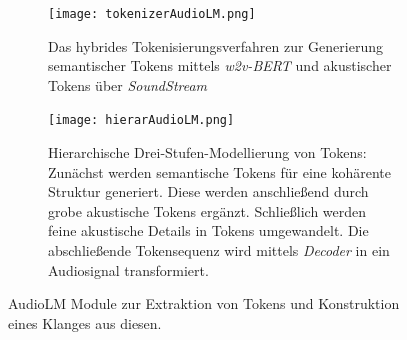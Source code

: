 \documentclass[
  a4paper,  %
  twoside,  %
  bibliography=totoc,
  headsepline,
  cleardoublepage=empty,
  parskip=half,
  draft=false
]{scrbook}
\begin{document}
\begin{figure}[h]
\centering
\begin{subfigure}{1.0\textwidth}
  \centering
  \texttt{[image: tokenizerAudioLM.png]}
  \caption[AudioLM Tokenisierungsverfahren]{Das hybrides Tokenisierungsverfahren zur Generierung semantischer Tokens mittels \emph{w2v-BERT} \cite{chung_w2v-bert_2021} und akustischer Tokens über \emph{SoundStream} \cite{zeghidour_soundstream_2021} \cite{borsos_audiolm_2022}
}
  \label{fig:tokenizerAudioLM}
\end{subfigure}

\vspace{1em} %

\begin{subfigure}{1.0\textwidth}
  \centering
  \texttt{[image: hierarAudioLM.png]}
  \caption[AudioLM Hierarchische Modellierung der Tokens]{Hierarchische Drei-Stufen-Modellierung von Tokens: Zunächst werden semantische Tokens für eine kohärente Struktur generiert. Diese werden anschließend durch grobe akustische Tokens ergänzt. Schließlich werden feine akustische Details in Tokens umgewandelt. Die abschließende Tokensequenz wird mittels \emph{Decoder} in ein Audiosignal transformiert. \cite{borsos_audiolm_2022}}
  \label{fig:hierarAudioLM}
\end{subfigure}
\caption[AudioLM Architektur]{AudioLM Module zur Extraktion von Tokens und Konstruktion eines Klanges aus diesen. \cite{borsos_audiolm_2022}}
\label{fig:test}
\end{figure}
\end{document}
